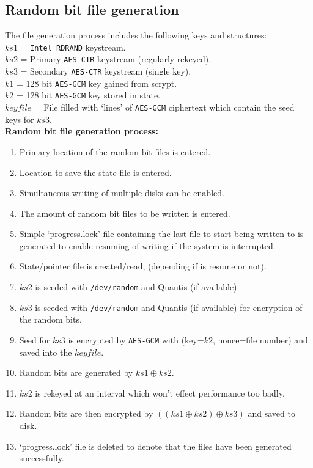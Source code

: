 \documentclass{paper}
\begin{document}
			\subsection{Random bit file generation}
				The file generation process includes the following keys and structures:\\
				$\mathit{ks1}$ = \texttt{Intel RDRAND} keystream.\\
				$\mathit{ks2}$ = Primary \texttt{AES-CTR} keystream (regularly rekeyed).\\
				$\mathit{ks3}$ = Secondary \texttt{AES-CTR} keystream (single key).\\
				$\mathit{k1}$ = 128 bit \texttt{AES-GCM} key gained from scrypt.\\
				$\mathit{k2}$ = 128 bit \texttt{AES-GCM} key stored in state.\\
				$\mathit{keyfile}$ = File filled with `lines' of \texttt{AES-GCM} ciphertext which contain the seed keys for $\mathit{ks3}$.\vspace{1em}\\
				\textbf{Random bit file generation process:}
				\vspace{-0.75em}
				\begin{enumerate}
					\setlength\itemsep{-0.3em}
					\item Primary location of the random bit files is entered.
					\item Location to save the state file is entered.
					\item Simultaneous writing of multiple disks can be enabled.
					\item The amount of random bit files to be written is entered.
					\item Simple `progress.lock' file containing the last file to start being written to is generated to enable resuming of writing if the system is interrupted.
					\item State/pointer file is created/read, (depending if is resume or not).
					\item $\mathit{ks2}$ is seeded with \texttt{/dev/random} and Quantis (if available).
					\item $\mathit{ks3}$ is seeded with \texttt{/dev/random} and Quantis (if available) for encryption of the random bits.
					\item Seed for $\mathit{ks3}$ is encrypted by \texttt{AES-GCM} with (key=$\mathit{k2}$, nonce=file number) and saved into the $\mathit{keyfile}$.
					\item Random bits are generated by $\mathit{ks1} \oplus \mathit{ks2}$.
					\item $\mathit{ks2}$ is rekeyed at an interval which won't effect performance too badly.
					\item Random bits are then encrypted by $((\mathit{ks1} \oplus \mathit{ks2}) \oplus\mathit{ks3})$ and saved to disk.
					\item `progress.lock' file is deleted to denote that the files have been generated successfully.
				\end{enumerate}
\end{document}
